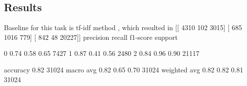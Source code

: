 \subsection{Results}





Baseline for this task is tf-idf method %
, which resulted in 
[[ 4310   102  3015]
 [  685  1016   779]
 [  842    48 20227]]
              precision    recall  f1-score   support

           0       0.74      0.58      0.65      7427
           1       0.87      0.41      0.56      2480
           2       0.84      0.96      0.90     21117

    accuracy                           0.82     31024
   macro avg       0.82      0.65      0.70     31024
weighted avg       0.82      0.82      0.81     31024

















